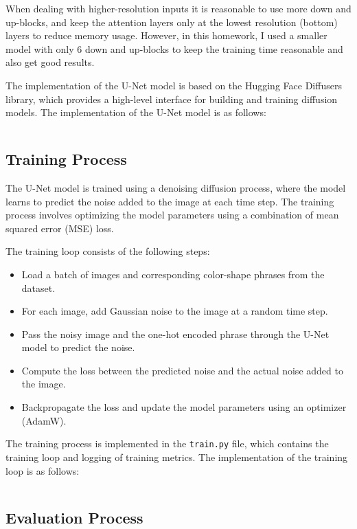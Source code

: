 When dealing with higher-resolution inputs it is reasonable to use more down and up-blocks, and keep the attention layers only at the lowest resolution (bottom) layers to reduce memory usage.
However, in this homework, I used a smaller model with only 6 down and up-blocks to keep the training time reasonable and also get good results.

The implementation of the U-Net model is based on the Hugging Face Diffusers library, which provides a high-level interface for building and training diffusion models. The implementation of the U-Net model is as follows:

\inputminted[firstline=5]{python}{../src/model.py}



\subsection{Training Process}
\label{sec:training_process}

The U-Net model is trained using a denoising diffusion process, where the model learns to predict the noise added to the image at each time step. The training process involves optimizing the model parameters using a combination of mean squared error (MSE) loss.

The training loop consists of the following steps:
\begin{itemize}
    \item Load a batch of images and corresponding color-shape phrases from the dataset.
    \item For each image, add Gaussian noise to the image at a random time step.
    \item Pass the noisy image and the one-hot encoded phrase through the U-Net model to predict the noise.
    \item Compute the loss between the predicted noise and the actual noise added to the image.
    \item Backpropagate the loss and update the model parameters using an optimizer (AdamW).
\end{itemize}

The training process is implemented in the \texttt{train.py} file, which contains the training loop and logging of training metrics. The implementation of the training loop is as follows:
\inputminted[firstline=16,lastline=138,highlightlines=78-111]{python}{../src/train.py}

\subsection{Evaluation Process}
\label{sec:evaluation_process}

